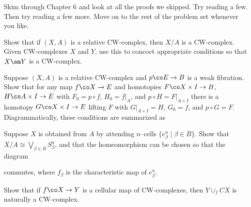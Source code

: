 \begin{task}
Skim through Chapter 6 and look at all the proofs we skipped.  Try reading a few.  Then try reading a few more.  Move on to the rest of the problem set whenever you like.
\end{task}

\begin{problem}
Show that if $(X, A)$ is a relative CW-complex, then $X/A$ is a CW-complex.  Given CW-complexes $X$ and $Y$, use this to concoct appropriate conditions so that $X \sm Y$ is a CW-complex.
\end{problem}

\begin{problem}
Suppose $(X, A)$ is a relative CW-complex and $p\co E \to B$ is a weak fibration.  Show that for any map $f\co X \to E$ and homotopies $F\co X \times I \to B$, $H\co A \times I \to E$ with $F_0 = p \circ f$, $H_0 = f|_A$, and $p \circ H = F|_{A \times I}$ there is a homotopy $G\co X \times I \to E$ lifting $F$ with $G|_{A \times I} = H$, $G_0 = f$, and $p \circ G = F$.  Diagrammatically, these conditions are summarized as
\begin{center}
\end{center}
\end{problem}

\begin{problem}
Suppose $X$ is obtained from $A$ by attending $n$--cells $\{e_\beta^n \mid \beta \in B\}$.  Show that $X / A \cong \bigvee_{\beta \in B} S^n_\beta$, and that the homeomorphism can be chosen so that the diagram
\begin{center}
\end{center}
commutes, where $f_\beta$ is the characteristic map of $e^n_\beta$.
\end{problem}

\begin{problem}
Show that if $f\co X \to Y$ is a cellular map of CW-complexes, then $Y \cup_f CX$ is naturally a CW-complex.
\end{problem}

